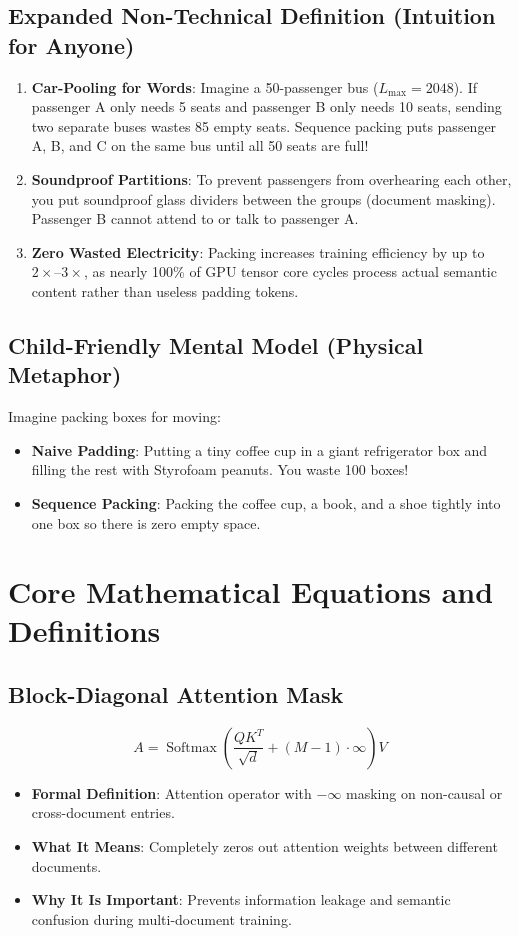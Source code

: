 \documentclass[11pt,a4paper]{article}
\theoremstyle{definition}
\begin{document}
\subsection{Expanded Non-Technical Definition (Intuition for Anyone)}
\begin{enumerate}
    \item \textbf{Car-Pooling for Words}: Imagine a 50-passenger bus ($L_{\max}=2048$). If passenger A only needs 5 seats and passenger B only needs 10 seats, sending two separate buses wastes 85 empty seats. Sequence packing puts passenger A, B, and C on the same bus until all 50 seats are full!
    \item \textbf{Soundproof Partitions}: To prevent passengers from overhearing each other, you put soundproof glass dividers between the groups (document masking). Passenger B cannot attend to or talk to passenger A.
    \item \textbf{Zero Wasted Electricity}: Packing increases training efficiency by up to $2\times\text{--}3\times$, as nearly 100\% of GPU tensor core cycles process actual semantic content rather than useless padding tokens.
\end{enumerate}

\subsection{Child-Friendly Mental Model (Physical Metaphor)}
Imagine packing boxes for moving:
\begin{itemize}
    \item \textbf{Naive Padding}: Putting a tiny coffee cup in a giant refrigerator box and filling the rest with Styrofoam peanuts. You waste 100 boxes!
    \item \textbf{Sequence Packing}: Packing the coffee cup, a book, and a shoe tightly into one box so there is zero empty space.
\end{itemize}

\section{Core Mathematical Equations and Definitions}

\subsection{Block-Diagonal Attention Mask}
{\boldmath
\begin{equation}
A = \operatorname{Softmax}\left( \frac{Q K^T}{\sqrt{d}} + (M - 1) \cdot \infty \right) V
\end{equation}
}
\begin{itemize}
    \item \textbf{Formal Definition}: Attention operator with $-\infty$ masking on non-causal or cross-document entries.
    \item \textbf{What It Means}: Completely zeros out attention weights between different documents.
    \item \textbf{Why It Is Important}: Prevents information leakage and semantic confusion during multi-document training.
\end{itemize}
\end{document}
